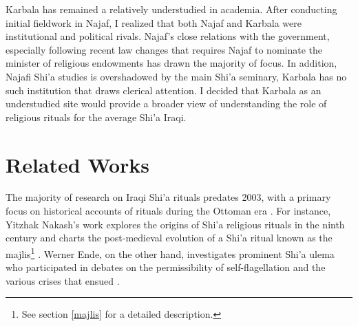 
Karbala has remained a relatively understudied in academia. After conducting initial fieldwork in Najaf, I realized that both Najaf and Karbala were institutional and political rivals. Najaf's close relations with the government, especially following recent law changes that requires Najaf to nominate the minister of religious endowments \cite{hamoudi_engagements_2020} has drawn the majority of focus. In addition, Najafi Shi'a studies is overshadowed by the main Shi'a seminary, Karbala has no such institution that draws clerical attention. I decided that Karbala as an understudied site would provide a broader view of understanding the role of religious rituals for the average Shi'a Iraqi. 


\section{Related Works}
The majority of research on Iraqi Shi'a rituals predates 2003, with a primary focus on historical accounts of rituals during the Ottoman era \cite{nakash_shiis_1994} \cite{brunner_twelver_2001} \cite{ayoub_redemptive_1978}. For instance, Yitzhak Nakash's work explores the origins of Shi'a religious rituals in the ninth century and charts the post-medieval evolution of a Shi'a ritual known as the majlis\footnote{See section \ref{majlis} for a detailed description.} \cite[164]{yitzhak_nakash_attempt_1993}. Werner Ende, on the other hand, investigates prominent Shi'a ulema who participated in debates on the permissibility of self-flagellation and the various crises that ensued \cite{ende_flagellations_1978}. 

